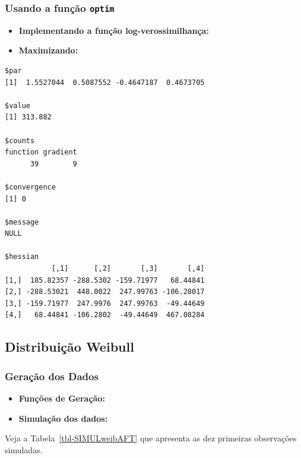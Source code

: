 \documentclass[
  12pt,
  letterpaper,
  DIV=11,
  numbers=noendperiod]{scrreprt}
\providecommand{\tightlist}{%
  \setlength{\itemsep}{0pt}\setlength{\parskip}{0pt}}\usepackage{longtable,booktabs,array}
\begin{document}
\subsubsection{\texorpdfstring{Usando a função
\texttt{optim}}{Usando a função optim}}\label{usando-a-funuxe7uxe3o-optim}

\begin{itemize}
\tightlist
\item
  \textbf{Implementando a função log-verossimilhança:}
\end{itemize}

\begin{itemize}
\tightlist
\item
  \textbf{Maximizando:}
\end{itemize}

\begin{verbatim}
$par
[1]  1.5527044  0.5087552 -0.4647187  0.4673705

$value
[1] 313.882

$counts
function gradient 
      39        9 

$convergence
[1] 0

$message
NULL

$hessian
           [,1]      [,2]       [,3]       [,4]
[1,]  185.82357 -288.5302 -159.71977   68.44841
[2,] -288.53021  448.0022  247.99763 -106.28017
[3,] -159.71977  247.9976  247.99763  -49.44649
[4,]   68.44841 -106.2802  -49.44649  467.08284
\end{verbatim}

\subsection{Distribuição Weibull}\label{distribuiuxe7uxe3o-weibull-2}

\subsubsection{Geração dos Dados}\label{gerauxe7uxe3o-dos-dados-1}

\begin{itemize}
\tightlist
\item
  \textbf{Funções de Geração:}
\end{itemize}

\begin{itemize}
\tightlist
\item
  \textbf{Simulação dos dados:}
\end{itemize}

Veja a Tabela~\ref{tbl-SIMULweibAFT} que apresenta as dez primeiras
observações simuladas.
\end{document}
